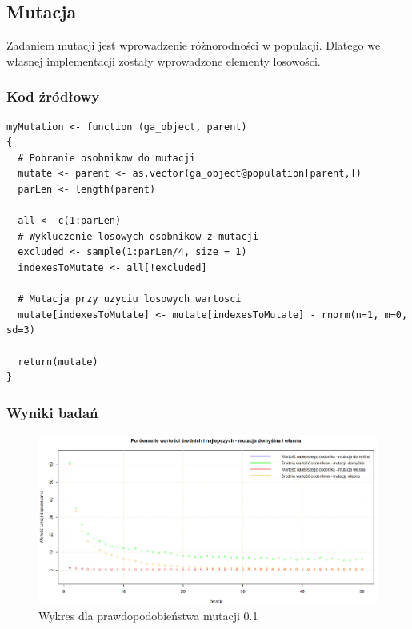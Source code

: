 \subsection{Mutacja}

Zadaniem mutacji jest wprowadzenie różnorodności w populacji. Dlatego we własnej implementacji zostały wprowadzone elementy losowości.

\subsubsection{Kod źródłowy}

\begin{lstlisting}[linewidth=16.0cm]
myMutation <- function (ga_object, parent) 
{
  # Pobranie osobnikow do mutacji
  mutate <- parent <- as.vector(ga_object@population[parent,])
  parLen <- length(parent)
  
  all <- c(1:parLen)
  # Wykluczenie losowych osobnikow z mutacji
  excluded <- sample(1:parLen/4, size = 1)
  indexesToMutate <- all[!excluded]
  
  # Mutacja przy uzyciu losowych wartosci
  mutate[indexesToMutate] <- mutate[indexesToMutate] - rnorm(n=1, m=0, sd=3)

  return(mutate)
} 
\end{lstlisting}

\subsubsection{Wyniki badań}

\begin{figure}[H]
	\centering
	\hspace*{-0.8in}
	\includegraphics[scale = 0.5]{img/zad1/mut_0_1}
	\caption{Wykres dla prawdopodobieństwa mutacji 0.1}  
	\label{rys:mut_0.1} 
\end{figure}

